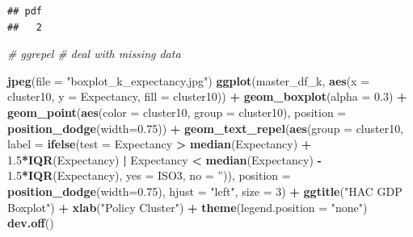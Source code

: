 \documentclass[]{article}
\newenvironment{Shaded}{\begin{snugshade}}{\end{snugshade}}
\newcommand{\CommentTok}[1]{\textcolor[rgb]{0.56,0.35,0.01}{\textit{#1}}}
\newcommand{\DataTypeTok}[1]{\textcolor[rgb]{0.13,0.29,0.53}{#1}}
\newcommand{\DecValTok}[1]{\textcolor[rgb]{0.00,0.00,0.81}{#1}}
\newcommand{\FloatTok}[1]{\textcolor[rgb]{0.00,0.00,0.81}{#1}}
\newcommand{\KeywordTok}[1]{\textcolor[rgb]{0.13,0.29,0.53}{\textbf{#1}}}
\newcommand{\NormalTok}[1]{#1}
\newcommand{\OperatorTok}[1]{\textcolor[rgb]{0.81,0.36,0.00}{\textbf{#1}}}
\newcommand{\StringTok}[1]{\textcolor[rgb]{0.31,0.60,0.02}{#1}}
\begin{document}
\begin{verbatim}
## pdf 
##   2
\end{verbatim}

\begin{Shaded}
\begin{Highlighting}[]
\CommentTok{# ggrepel}
\CommentTok{# deal with missing data}
\end{Highlighting}
\end{Shaded}

\begin{Shaded}
\begin{Highlighting}[]
\KeywordTok{jpeg}\NormalTok{(}\DataTypeTok{file =} \StringTok{"boxplot_k_expectancy.jpg"}\NormalTok{)}
\KeywordTok{ggplot}\NormalTok{(master_df_k, }
       \KeywordTok{aes}\NormalTok{(}\DataTypeTok{x =}\NormalTok{ cluster10, }\DataTypeTok{y =}\NormalTok{ Expectancy, }\DataTypeTok{fill =}\NormalTok{ cluster10)) }\OperatorTok{+}
\StringTok{  }\KeywordTok{geom_boxplot}\NormalTok{(}\DataTypeTok{alpha =} \FloatTok{0.3}\NormalTok{) }\OperatorTok{+}
\StringTok{  }\KeywordTok{geom_point}\NormalTok{(}\KeywordTok{aes}\NormalTok{(}\DataTypeTok{color =}\NormalTok{ cluster10, }\DataTypeTok{group =}\NormalTok{ cluster10), }\DataTypeTok{position =} \KeywordTok{position_dodge}\NormalTok{(}\DataTypeTok{width=}\FloatTok{0.75}\NormalTok{)) }\OperatorTok{+}
\StringTok{  }\KeywordTok{geom_text_repel}\NormalTok{(}\KeywordTok{aes}\NormalTok{(}\DataTypeTok{group =}\NormalTok{ cluster10, }
                \DataTypeTok{label =} \KeywordTok{ifelse}\NormalTok{(}\DataTypeTok{test =}\NormalTok{ Expectancy }\OperatorTok{>}\StringTok{ }\KeywordTok{median}\NormalTok{(Expectancy)}
                               \OperatorTok{+}\StringTok{ }\FloatTok{1.5}\OperatorTok{*}\KeywordTok{IQR}\NormalTok{(Expectancy) }\OperatorTok{|}\StringTok{ }\NormalTok{Expectancy }\OperatorTok{<}\StringTok{ }
\StringTok{                                 }\KeywordTok{median}\NormalTok{(Expectancy) }\OperatorTok{-}\StringTok{ }\FloatTok{1.5}\OperatorTok{*}\KeywordTok{IQR}\NormalTok{(Expectancy), }
                  \DataTypeTok{yes =}\NormalTok{ ISO3,}
                  \DataTypeTok{no =} \StringTok{''}\NormalTok{)), }
            \DataTypeTok{position =} \KeywordTok{position_dodge}\NormalTok{(}\DataTypeTok{width=}\FloatTok{0.75}\NormalTok{),}
            \DataTypeTok{hjust =} \StringTok{"left"}\NormalTok{, }\DataTypeTok{size =} \DecValTok{3}\NormalTok{) }\OperatorTok{+}\StringTok{ }\KeywordTok{ggtitle}\NormalTok{(}\StringTok{"HAC GDP Boxplot"}\NormalTok{) }\OperatorTok{+}\StringTok{ }
\StringTok{  }\KeywordTok{xlab}\NormalTok{(}\StringTok{"Policy Cluster"}\NormalTok{) }\OperatorTok{+}\StringTok{ }\KeywordTok{theme}\NormalTok{(}\DataTypeTok{legend.position =} \StringTok{"none"}\NormalTok{)}
\KeywordTok{dev.off}\NormalTok{()}
\end{Highlighting}
\end{Shaded}
\end{document}
